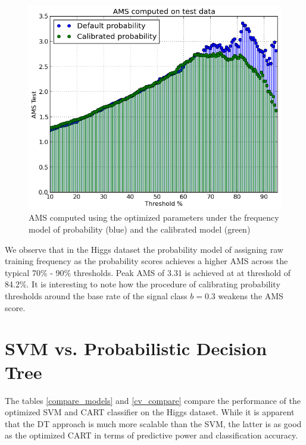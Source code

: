 \documentclass[final,3p,times,twocolumn]{elsarticle}
\begin{document}
\begin{figure}
\includegraphics[scale=0.5]{Images/AMS_Probability_Compare.png}
\caption{AMS computed using the optimized parameters under the frequency model of probability (blue) and the calibrated model (green)}
\label{ams_compare}
\end{figure}

We observe that in the Higgs dataset the probability model of assigning raw training frequency as the probability scores achieves a higher AMS across the typical 70\% - 90\% thresholds. Peak AMS of 3.31 is achieved at at threshold of 84.2\%. It is interesting to note how the procedure of calibrating probability thresholds around the base rate of the signal class $b=0.3$ weakens the AMS score. 


\section{SVM vs. Probabilistic Decision Tree}
\label{compare}

The tables \ref{compare_models} and \ref{cv_compare} compare the performance of the optimized SVM and CART classifier on the Higgs dataset. While it is apparent that the DT approach is much more scalable than the SVM, the latter is as good as the optimized CART in terms of predictive power and classification accuracy.  
\end{document}
